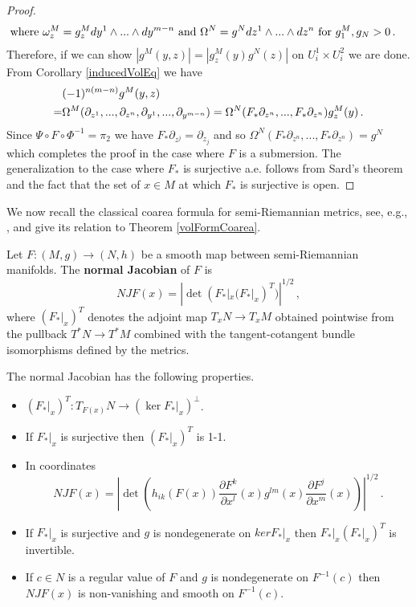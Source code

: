 \begin{proof}
\begin{align}
&\text{where }\omega^M_z=g^M_z dy^1\wedge...\wedge dy^{m-n} \text{ and }\Omega^N=g^N dz^1\wedge...\wedge dz^n \text{ for } g_1^M,g_N>0\,.\notag
\end{align}
Therefore, if we can show $|g^M(y,z)|=|g_z^M(y)g^N(z)|$ on $U_i^1\times U_i^2$ we are done. From Corollary \ref{inducedVolEq} we have
\begin{align}
&(-1)^{n(m-n)} g^M(y,z)\\
=&\Omega^M(\partial_{z^1},...,\partial_{z^n},\partial_{y^1},...,\partial_{y^{m-n}})=\Omega^N(F_*\partial_{z^n},...,F_*\partial_{z^n})g_z^M(y)\,.\notag
\end{align}
Since $\Psi\circ F\circ\Phi^{-1}=\pi_2$ we have $F_*\partial_{z^j}=\partial_{z_j}$ and so $\Omega^N(F_*\partial_{z^n},...,F_*\partial_{z^n})=g^N$ which completes the proof in the case where $F$ is a submersion.  The generalization to the case where $F_*$ is surjective a.e. follows from Sard's theorem and the fact that the set of $x\in M$ at which $F_*$ is surjective is open.
\end{proof}
We now recall the classical coarea formula for semi-Riemannian metrics, see, e.g., \cite{chavel1995riemannian},  and give its relation to Theorem \ref{volFormCoarea}.
\begin{definition}
Let $F:(M,g)\rightarrow (N,h)$ be a smooth map between semi-Riemannian manifolds.  The {\bf normal Jacobian} of $F$ is
\begin{equation}
NJF(x)=|\det(F_*|_x(F_*|_x)^T)|^{1/2}\,,
\end{equation}
where $(F_*|_x)^T$ denotes the adjoint map $T_xN\rightarrow T_xM$ obtained pointwise from the pullback $T^*N\rightarrow T^*M$ combined with the tangent-cotangent bundle isomorphisms defined by the metrics.
\end{definition}

\begin{lemma}
The normal Jacobian has the following properties.
\begin{itemize}
\item $(F_*|_x)^T:T_{F(x)}N\rightarrow (\ker F_*|_x)^\perp$.
\item If $F_*|_x$ is surjective then $(F_*|_x)^T$ is 1-1.
\item In coordinates
\begin{equation}
NJF(x)=\left|\det\left(h_{ik}(F(x))\frac{\partial F^k}{\partial x^l}(x)g^{lm}(x)\frac{\partial F^j}{\partial x^m}(x)\right)\right|^{1/2}\,.
\end{equation}
\item  If $F_*|_x$ is surjective and $g$ is nondegenerate on $ker F_*|_x$ then $F_*|_x(F_*|_x)^T$ is invertible.
\item If $c\in N$ is a regular value of $F$ and $g$ is nondegenerate on $F^{-1}(c)$ then $NJF(x)$ is non-vanishing and smooth on $F^{-1}(c)$.
\end{itemize}
\end{lemma}

